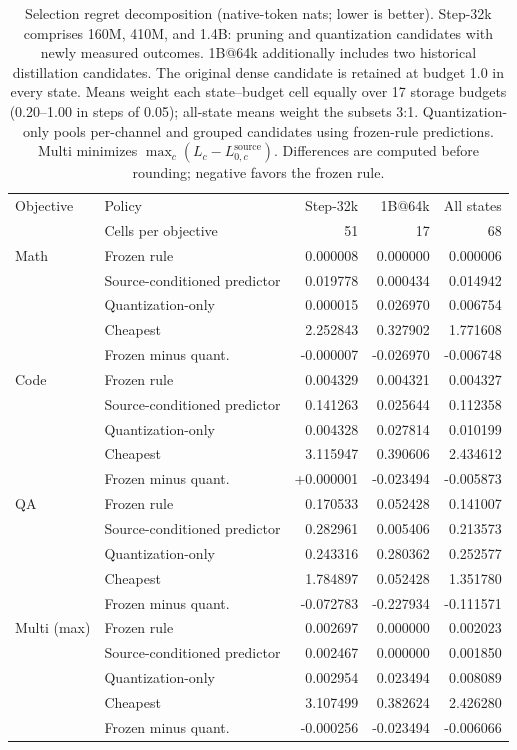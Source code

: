 \begin{table}[H]
\centering\small
\setlength{\tabcolsep}{4pt}\renewcommand{\arraystretch}{1.08}
\begin{tabular}{@{}llrrr@{}}
\toprule
Objective & Policy & Step-32k & 1B@64k & All states \\
 & Cells per objective & 51 & 17 & 68 \\
\midrule
Math & Frozen rule & 0.000008 & 0.000000 & 0.000006 \\
 & Source-conditioned predictor & 0.019778 & 0.000434 & 0.014942 \\
 & Quantization-only & 0.000015 & 0.026970 & 0.006754 \\
 & Cheapest & 2.252843 & 0.327902 & 1.771608 \\
 & Frozen minus quant. & -0.000007 & -0.026970 & -0.006748 \\
\addlinespace
Code & Frozen rule & 0.004329 & 0.004321 & 0.004327 \\
 & Source-conditioned predictor & 0.141263 & 0.025644 & 0.112358 \\
 & Quantization-only & 0.004328 & 0.027814 & 0.010199 \\
 & Cheapest & 3.115947 & 0.390606 & 2.434612 \\
 & Frozen minus quant. & +0.000001 & -0.023494 & -0.005873 \\
\addlinespace
QA & Frozen rule & 0.170533 & 0.052428 & 0.141007 \\
 & Source-conditioned predictor & 0.282961 & 0.005406 & 0.213573 \\
 & Quantization-only & 0.243316 & 0.280362 & 0.252577 \\
 & Cheapest & 1.784897 & 0.052428 & 1.351780 \\
 & Frozen minus quant. & -0.072783 & -0.227934 & -0.111571 \\
\addlinespace
Multi (max) & Frozen rule & 0.002697 & 0.000000 & 0.002023 \\
 & Source-conditioned predictor & 0.002467 & 0.000000 & 0.001850 \\
 & Quantization-only & 0.002954 & 0.023494 & 0.008089 \\
 & Cheapest & 3.107499 & 0.382624 & 2.426280 \\
 & Frozen minus quant. & -0.000256 & -0.023494 & -0.006066 \\
\bottomrule
\end{tabular}
\caption{Selection regret decomposition (native-token nats; lower is better). Step-32k comprises 160M, 410M, and 1.4B: pruning and quantization candidates with newly measured outcomes. 1B@64k additionally includes two historical distillation candidates. The original dense candidate is retained at budget 1.0 in every state. Means weight each state--budget cell equally over 17 storage budgets (0.20--1.00 in steps of 0.05); all-state means weight the subsets 3:1. Quantization-only pools per-channel and grouped candidates using frozen-rule predictions. Multi minimizes $\max_c(L_c-L_{0,c}^{\mathrm{source}})$. Differences are computed before rounding; negative favors the frozen rule.}
\label{tab:rule_decomp}
\end{table}

